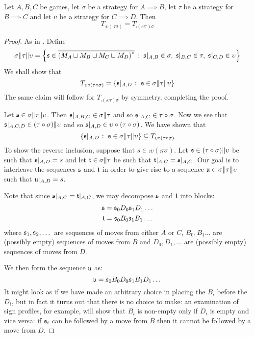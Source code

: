 \documentclass{article}
\begin{document}
\begin{proposition}\label{traceAssociativity}
  Let $A,B,C$ be games, let $\sigma$ be a strategy for $A\implies B$, let $\tau$ be a strategy for $B\implies C$ and let $\upsilon$ be a strategy for $C\implies D$.  Then
  \[
    T_{\comp{\upsilon}{(\comp\tau\sigma)}} = T_{\comp{(\comp\upsilon\tau)}{\sigma}}
    \]

  \begin{proof}
    As in \cite{abramskyjagadeesangames}.  Define
    \[
      \sigma\|\tau\|\upsilon = \left\{\mathfrak s\in{\overline{{(M_A \sqcup M_B \sqcup M_C \sqcup M_D)}^{*}}} \;\colon\; \mathfrak s\vert_{A,B}\in\sigma,\;\mathfrak s\vert_{B,C}\in\tau,\;\mathfrak s\vert_{C,D}\in\upsilon\right\}
      \]
    We shall show that 
    \[
      T_{\upsilon \circ (\tau \circ \sigma)} = \{\mathfrak s\vert_{A,D}\;\colon\;\mathfrak s\in\sigma\|\tau\|\upsilon\}
      \]
    The same claim will follow for $T_{\comp{(\comp{\upsilon}{\tau})}{\sigma}}$ by symmetry, completing the proof.

    Let $\mathfrak s\in\sigma\|\tau\|\upsilon$.  Then $\mathfrak s\vert_{A,B,C}\in\sigma\|\tau$ and so $\mathfrak s\vert_{A,C}\in\tau \circ \sigma$.  Now we see that $\mathfrak s\vert_{A,C,D}\in (\tau \circ \sigma)\|\upsilon$ and so $\mathfrak s\vert_{A,D}\in\upsilon \circ (\tau \circ \sigma)$.  We have shown that
    \[
      \{\mathfrak s\vert_{A,D}\;\colon\;\mathfrak s\in\sigma\|\tau\|\upsilon\} \subseteq T_{\upsilon \circ (\tau \circ \sigma)}
      \]
    To show the reverse inclusion, suppose that $s\in\comp{\upsilon}{(\comp\tau\sigma)}$.  Let $\mathfrak s\in(\tau \circ \sigma)\|\upsilon$ be such that $\mathfrak s\vert_{A,D}=s$ and let $\mathfrak t\in\sigma\|\tau$ be such that $\mathfrak t\vert_{A,C}=\mathfrak s\vert_{A,C}$.  Our goal is to interleave the sequences $\mathfrak s$ and $\mathfrak t$ in order to give rise to a sequence $\mathfrak u\in\sigma\|\tau\|\upsilon$ such that $\mathfrak u\vert_{A,D}=s$.  

    Note that since $\mathfrak s\vert_{A,C}=\mathfrak t\vert_{A,C}$, we may decompose $\mathfrak s$ and $\mathfrak t$ into blocks:
    \begin{gather*}
      \mathfrak s = \mathfrak s_0D_0\mathfrak s_1D_1\dots\\
      \mathfrak t = \mathfrak s_0B_0\mathfrak s_1B_1\dots
    \end{gather*}
    where $\mathfrak s_1,\mathfrak s_2,\dots$ are sequences of moves from either $A$ or $C$, $B_0,B_1\dots$ are (possibly empty) sequences of moves from $B$ and $D_0,D_1,\dots$ are (possibly empty) sequences of moves from $D$.

    We then form the sequence $\mathfrak u$ as:
    \[
      \mathfrak u = \mathfrak s_0B_0D_0\mathfrak s_1B_1D_1\dots
      \]
    It might look as if we have made an arbitrary choice in placing the $B_i$ before the $D_i$, but in fact it turns out that there is no choice to make: an examination of sign profiles, for example, will show that $B_i$ is non-empty only if $D_i$ is empty and vice versa: if $\mathfrak s_i$ can be followed by a move from $B$ then it cannot be followed by a move from $D$.


\end{proof}
\end{proposition}
\end{document}
